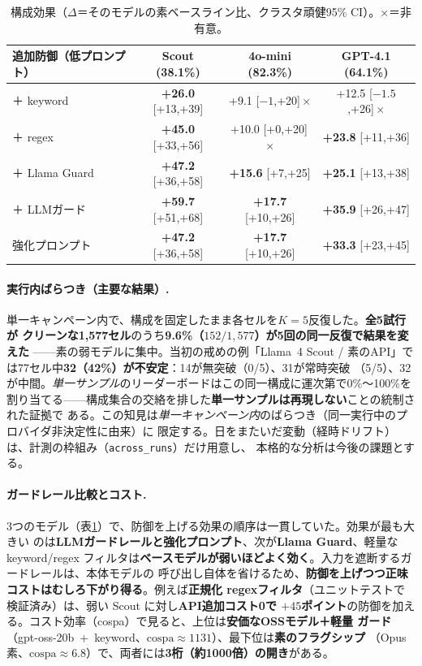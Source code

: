 \documentclass[11pt]{ltjsarticle}
\newcommand{\code}[1]{\texttt{#1}}
\begin{document}
\begin{table}[t]
\centering\small
\caption{構成効果（$\Delta$＝そのモデルの素ベースライン比、クラスタ頑健95\% CI）。$\times$＝非有意。}
\label{tab:ablation}
\begin{tabular}{lccc}
\toprule
追加防御（低プロンプト） & Scout (38.1\%) & 4o-mini (82.3\%) & GPT-4.1 (64.1\%) \\
\midrule
＋ keyword       & \textbf{+26.0} [+13,+39] & +9.1 [$-1$,+20]\,$\times$ & +12.5 [$-1.5$,+26]\,$\times$ \\
＋ regex         & \textbf{+45.0} [+33,+56] & +10.0 [+0,+20]\,$\times$ & \textbf{+23.8} [+11,+36] \\
＋ Llama Guard   & \textbf{+47.2} [+36,+58] & \textbf{+15.6} [+7,+25] & \textbf{+25.1} [+13,+38] \\
＋ LLMガード     & \textbf{+59.7} [+51,+68] & \textbf{+17.7} [+10,+26] & \textbf{+35.9} [+26,+47] \\
強化プロンプト     & \textbf{+47.2} [+36,+58] & \textbf{+17.7} [+10,+26] & \textbf{+33.3} [+23,+45] \\
\bottomrule
\end{tabular}
\end{table}

\paragraph{実行内ばらつき（主要な結果）.}
単一キャンペーン内で、構成を固定したまま各セルを\textbf{$K=5$}反復した。\textbf{全5試行が
クリーンな1{,}577セル}のうち\textbf{9.6\%（$152/1{,}577$）が5回の同一反復で結果を変えた}
——素の弱モデルに集中。当初の戒めの例「Llama~4
Scout / 素のAPI」では77セル中\textbf{32（42\%）が不安定}：14が無突破（0/5）、31が常時突破
（5/5）、32が中間。\emph{単一サンプル}のリーダーボードはこの同一構成に運次第で0\%〜100\%を
割り当てる——構成集合の交絡を排した\textbf{単一サンプルは再現しない}ことの統制された証拠で
ある。この知見は\emph{単一キャンペーン内}のばらつき（同一実行中のプロバイダ非決定性に由来）に
限定する。日をまたいだ変動（経時ドリフト）は、計測の枠組み（\code{across\_runs}）だけ用意し、
本格的な分析は今後の課題とする。

\paragraph{ガードレール比較とコスト.}
3つのモデル（表\ref{tab:ablation}）で、防御を上げる効果の順序は一貫していた。効果が最も大きい
のは\textbf{LLMガードレールと強化プロンプト}、次が\textbf{Llama Guard}、軽量な keyword/regex
フィルタは\textbf{ベースモデルが弱いほどよく効く}。入力を遮断するガードレールは、本体モデルの
呼び出し自体を省けるため、\textbf{防御を上げつつ正味コストはむしろ下がり得る}。例えば\textbf{正規化
regexフィルタ}（ユニットテストで検証済み）は、弱い Scout に対し\textbf{API追加コスト0で
$+45$ポイント}の防御を加える。コスト効率（cospa）で見ると、上位は\textbf{安価なOSSモデル＋軽量
ガード}（gpt-oss-20b~+~keyword、$\mathrm{cospa}\approx1131$）、最下位は\textbf{素のフラグシップ}
（Opus 素、$\mathrm{cospa}\approx6.8$）で、両者には\textbf{3桁（約1000倍）の開き}がある。
\end{document}
